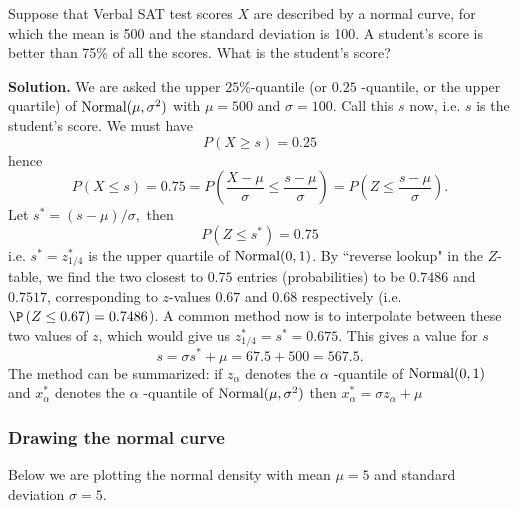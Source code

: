 \begin{example}
Suppose that Verbal SAT test scores $X$ are described by a
normal curve, for which the mean is 500 and the standard deviation is 100. A
student's score is better than 75\% of all the scores. What is the student's
score?


\medskip \textbf{Solution. }We are asked the upper $25$\%-quantile (or $0.25$%
-quantile, or the upper quartile) of $\mbox{{\rm Normal}}(\mu ,\sigma ^{2})$ with $\mu =500$
and $\sigma =100.$ Call this $s$ now, i.e. $s$ is the student's score. We
must have 
\begin{equation*}
P(X\geq s)=0.25
\end{equation*}%
hence 
\begin{equation*}
P(X\leq s)=0.75=P\left( \frac{X-\mu }{\sigma }\leq \frac{s-\mu }{\sigma }%
\right) =P\left( Z\leq \frac{s-\mu }{\sigma }\right) .
\end{equation*}%
Let $s^{\ast }=(s-\mu )/\sigma ,$ then 
\begin{equation*}
P\left( Z\leq s^{\ast }\right) =0.75
\end{equation*}%
i.e. $s^{\ast }=z_{1/4}^{\ast }$ is the upper quartile of $\mbox{{\rm Normal}}(0,1)$. By
``reverse lookup" in the $Z$-table, we find the two closest to $0.75$ entries
(probabilities) to be $0.7486$ and $0.7517$, corresponding to $z$-values $%
0.67$ and $0.68$ respectively (i.e. $\P \left( Z\leq 0.67\right) =0.7486$).
A common method now is to interpolate between these two values of $z$, which
would give us $z_{1/4}^{\ast }=s^{\ast }=0.675$. This gives a value for $s$ 
\begin{equation*}
s=\sigma s^{\ast }+\mu =67.5+500=567.5.
\end{equation*}%
The method can be summarized: if $z_{\alpha}$ denotes the $\alpha $%
-quantile of $\mbox{{\rm Normal}}(0,1)$ and $x_{\alpha }^{\ast }$ denotes the $\alpha $%
-quantile of $\mbox{{\rm Normal}}(\mu ,\sigma ^{2})$ then $x_{\alpha }^{\ast }=\sigma
z_{\alpha}+\mu $
\end{example}

\subsubsection{Drawing the normal curve}

Below we are plotting the normal density with mean $\mu =5$ and standard
deviation $\sigma =5$.

\vspace{5cm}
~\\

